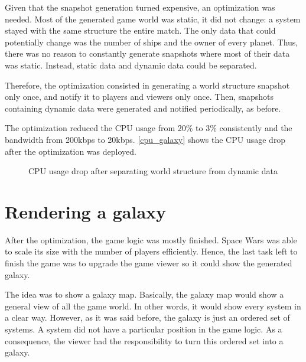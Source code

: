 \documentclass[a4paper,11pt,titlepage,abstract,numbers=noenddot,automark,mnsy,intlimits,rgb,dvipsnames]{report}
\begin{document}
Given that the snapshot generation turned expensive, an optimization was needed. Most of the generated game world was static,
it did not change: a system stayed with the same structure the entire match. The only data that could potentially change
was the number of ships and the owner of every planet. Thus, there was no reason to constantly generate snapshots where most of
their data was static. Instead, static data and dynamic data could be separated.

Therefore, the optimization consisted in generating a world structure snapshot only once, and notify it to players and
viewers only once. Then, snapshots containing dynamic data were generated and notified periodically, as before.

The optimization reduced the CPU usage from 20\% to 3\% consistently and the bandwidth from 200kbps to 20kbps.
\autoref{cpu_galaxy} shows the CPU usage drop after the optimization was deployed.
\begin{figure}[H]
\noindent{}
\caption{CPU usage drop after separating world structure from dynamic data}
\label{cpu_galaxy}
\end{figure}
\section{Rendering a galaxy}
After the optimization, the game logic was mostly finished. Space Wars was able to scale its size with the number of players
efficiently. Hence, the last task left to finish the game was to upgrade the game viewer so it could show the generated galaxy.

The idea was to show a galaxy map. Basically, the galaxy map would show a general view of all the game world. In other words,
it would show every system in a clear way. However, as it was said before, the galaxy is just an ordered set of systems.
A system did not have a particular position in the game logic. As a consequence, the viewer had the responsibility to turn this
ordered set into a galaxy.
\end{document}
